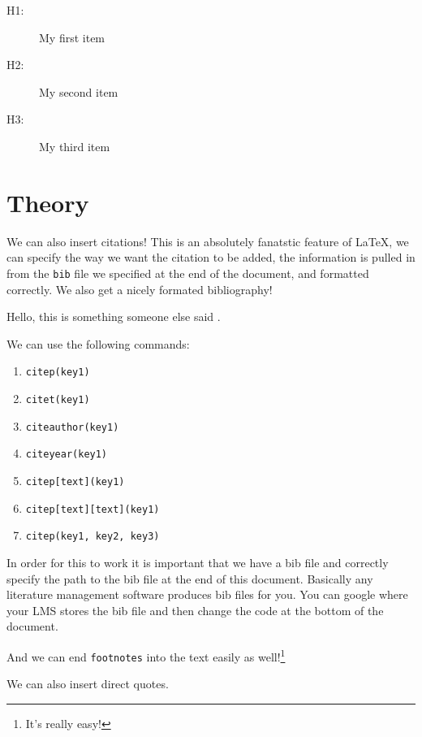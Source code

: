 \documentclass{article}
\begin{document}
\begin{description}
    \item[H1:] My first item
    \item[H2:] My second item
    \item[H3:] My third item
\end{description} 

\newpage
\section{Theory}
\label{sec:theory}

We can also insert citations! This is an absolutely fanatstic feature of \LaTeX, we can specify the way we want the citation to be added, the information is pulled in from the \texttt{bib} file we specified at the end of the document, and formatted correctly. We also get a nicely formated bibliography!



Hello, this is something someone else said \citep{lee2019machine}.

We can use the following commands:
\begin{enumerate}
    \item \texttt{citep(key1)} \citep{smith2020impact}
    \item \texttt{citet(key1)} \citet{smith2020impact}
    \item \texttt{citeauthor(key1)} \citeauthor{smith2020impact}
    \item \texttt{citeyear(key1)} \citeyear{smith2020impact}
    \item \texttt{citep[text](key1)} \citep[pp.20]{smith2020impact}
    \item \texttt{citep[text][text](key1)} \citep[for example][pp.20]{smith2020impact}
    \item \texttt{citep(key1, key2, key3)} \citep{smith2020impact,brown2018statistics,lee2019machine}
\end{enumerate}


In order for this to work it is important that we have a bib file and correctly specify the path to the bib file at the end of this document. Basically any literature management software produces bib files for you. You can google where your LMS stores the bib file and then change the code at the bottom of the document.


And we can end \texttt{footnotes} into the text easily as well!\footnote{It's really easy!}


We can also insert direct quotes. 
\end{document}
